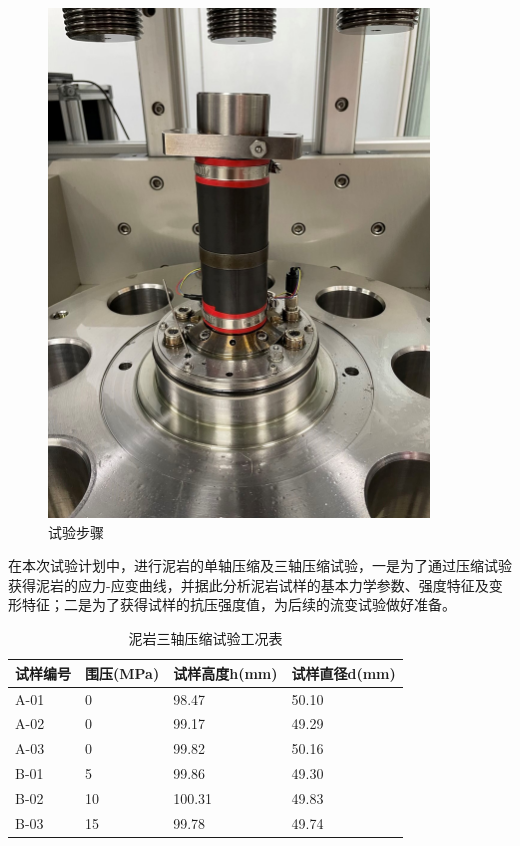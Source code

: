 \begin{figure}[ht!]
{\begin{minipage}{7cm}
            \includegraphics[width=0.9\textwidth]{img/chap2/试样放置.png}
        \end{minipage}
    }
    \caption{试验步骤}
    \label{fig:2-3}
\end{figure}


在本次试验计划中，进行泥岩的单轴压缩及三轴压缩试验，一是为了通过压缩试验获得泥岩的应力-应变曲线，并据此分析泥岩试样的基本力学参数、强度特征及变形特征；二是为了获得试样的抗压强度值，为后续的流变试验做好准备。



\begin{table}[ht!]\small
    \centering
    \begin{tabular}{p{3cm}<{\centering} p{3cm}<{\centering} p{3cm}<{\centering} p{3cm}<{\centering}}
        \toprule
        试样编号  & 围压(MPa)  &  试样高度h(mm)   &  试样直径d(mm)\\
        \midrule
        A-01        & 0  &   98.47  &  50.10   \\ 
        A-02        & 0  &   99.17  &  49.29   \\ 
        A-03        & 0  &   99.82  &  50.16  \\ 
        \midrule
        B-01        & 5  &   99.86  &  49.30    \\ 
        B-02        & 10 &   100.31 &  49.83    \\ 
        B-03        & 15 &   99.78  &  49.74 \\ 
        \bottomrule
    \end{tabular}
    \caption{泥岩三轴压缩试验工况表}
    \label{tab:泥岩三轴压缩试验工况表}
\end{table}



